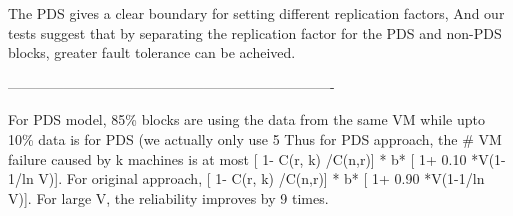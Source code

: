 {The PDS gives a clear boundary for setting different replication factors,
And our tests suggest that by separating the replication factor for the PDS
and non-PDS blocks, greater fault tolerance can be acheived.

----------------------------------------------------------------------

For PDS model, 85\% blocks are using the data from the same VM while upto 10\% data is for PDS (we actually only use 5%
Thus  for PDS approach,   the # VM failure caused by k machines is at most  [ 1-  C(r, k) /C(n,r)] * b* [ 1+ 0.10 *V(1-1/ln V)].
For original approach,  [ 1-  C(r, k) /C(n,r)] * b* [ 1+ 0.90 *V(1-1/ln V)].
For large V, the reliability improves by 9 times.
}
